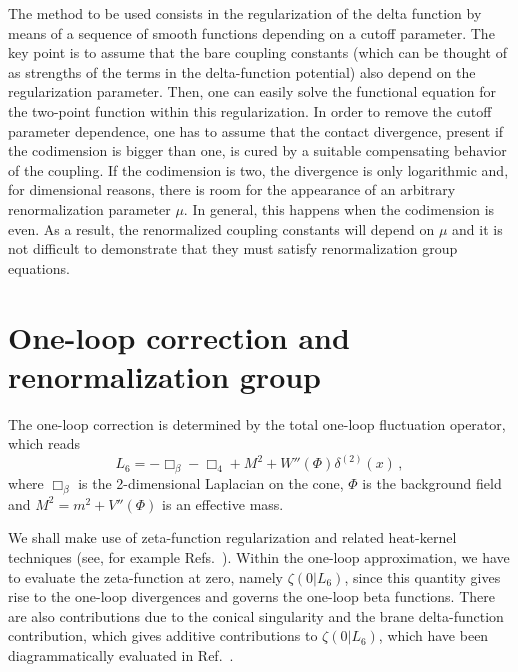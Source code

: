 \documentclass[a4paper,aps,prl,preprint,groupedaddress,showpacs,nobibnotes,tightenlines]{revtex4}
\begin{document}
The method to be used \cite{faddeev} consists in the 
regularization of the delta function by means of a  sequence of smooth  
functions depending on 
a cutoff parameter. The key point is to assume that the bare coupling
constants (which can be thought of as strengths of the terms in
the delta-function
potential) also depend on the regularization parameter.  
Then, one can easily solve  the 
functional equation for the two-point function within this regularization. 
In order to remove the 
cutoff parameter dependence, one has to assume that the contact divergence, 
present if the 
codimension is bigger than one, is cured  by a suitable compensating 
behavior of the coupling. If the
codimension is two, the divergence is only logarithmic and, 
for dimensional reasons,  there is room for the appearance  of an 
arbitrary renormalization parameter $\mu$. 
In general, this happens when the codimension is even.  
As a result, the renormalized coupling constants will depend on $\mu$ and 
it is not difficult to demonstrate that they must satisfy renormalization 
group equations.


\section{One-loop correction and renormalization group}
 
The one-loop correction is determined by the  total one-loop fluctuation 
operator, which  reads 
\begin{equation}
L_6 = -\Box_\beta -\Box_4+M^2+W''(\Phi)\delta^{(2)}(x)\,, 
\label{3}
\end{equation}
where $\Box_\beta$ is the 2-dimensional Laplacian on the cone, $ \Phi $ 
is the background field and $M^2=m^2+V''(\Phi)$ is an 
effective mass.

We shall make use of zeta-function regularization and related heat-kernel 
techniques (see, for example Refs.~\cite{elib,bytsenko96}).
Within the one-loop approximation,  we have to evaluate the
zeta-function at zero, namely $\zeta(0|L_6)$, since this quantity 
gives rise to the one-loop divergences and governs the one-loop beta functions.
There are also contributions due to the conical singularity and the brane 
delta-function contribution, which gives additive 
contributions to  $\zeta(0|L_6)$, which have been diagrammatically 
evaluated in Ref.~\cite{wise}.
\end{document}
